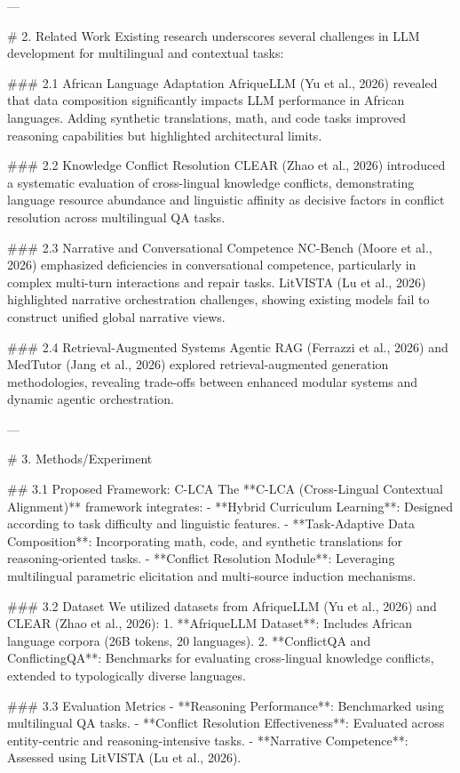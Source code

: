 ---

# 2. Related Work  
Existing research underscores several challenges in LLM development for multilingual and contextual tasks:  

### 2.1 African Language Adaptation  
AfriqueLLM (Yu et al., 2026) revealed that data composition significantly impacts LLM performance in African languages. Adding synthetic translations, math, and code tasks improved reasoning capabilities but highlighted architectural limits.

### 2.2 Knowledge Conflict Resolution  
CLEAR (Zhao et al., 2026) introduced a systematic evaluation of cross-lingual knowledge conflicts, demonstrating language resource abundance and linguistic affinity as decisive factors in conflict resolution across multilingual QA tasks.

### 2.3 Narrative and Conversational Competence  
NC-Bench (Moore et al., 2026) emphasized deficiencies in conversational competence, particularly in complex multi-turn interactions and repair tasks. LitVISTA (Lu et al., 2026) highlighted narrative orchestration challenges, showing existing models fail to construct unified global narrative views.

### 2.4 Retrieval-Augmented Systems  
Agentic RAG (Ferrazzi et al., 2026) and MedTutor (Jang et al., 2026) explored retrieval-augmented generation methodologies, revealing trade-offs between enhanced modular systems and dynamic agentic orchestration.

---

# 3. Methods/Experiment  

## 3.1 Proposed Framework: C-LCA  
The **C-LCA (Cross-Lingual Contextual Alignment)** framework integrates:  
- **Hybrid Curriculum Learning**: Designed according to task difficulty and linguistic features.  
- **Task-Adaptive Data Composition**: Incorporating math, code, and synthetic translations for reasoning-oriented tasks.  
- **Conflict Resolution Module**: Leveraging multilingual parametric elicitation and multi-source induction mechanisms.  

### 3.2 Dataset  
We utilized datasets from AfriqueLLM (Yu et al., 2026) and CLEAR (Zhao et al., 2026):  
1. **AfriqueLLM Dataset**: Includes African language corpora (26B tokens, 20 languages).  
2. **ConflictQA and ConflictingQA**: Benchmarks for evaluating cross-lingual knowledge conflicts, extended to typologically diverse languages.

### 3.3 Evaluation Metrics  
- **Reasoning Performance**: Benchmarked using multilingual QA tasks.  
- **Conflict Resolution Effectiveness**: Evaluated across entity-centric and reasoning-intensive tasks.  
- **Narrative Competence**: Assessed using LitVISTA (Lu et al., 2026).  

